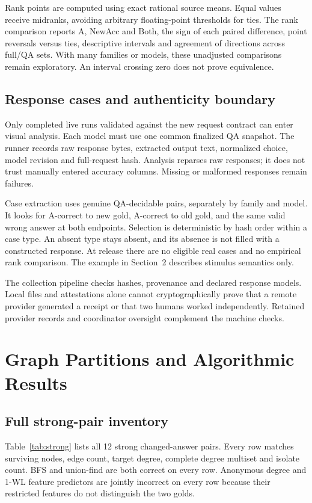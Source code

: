 \documentclass[10pt,twocolumn,letterpaper]{article}
\begin{document}
Rank points are computed using exact rational source means. Equal
values receive midranks, avoiding arbitrary floating-point thresholds
for ties. The rank comparison reports A, NewAcc and Both, the sign
of each paired difference, point reversals versus ties, descriptive
intervals and agreement of directions across full/QA sets. With many
families or models, these unadjusted comparisons remain exploratory.
An interval crossing zero does not prove equivalence.

\subsection{Response cases and authenticity boundary}
Only completed live runs validated against the new request contract
can enter visual analysis. Each model must use one common finalized
QA snapshot. The runner records raw response bytes, extracted output
text, normalized choice, model revision and full-request hash. Analysis
reparses raw responses; it does not trust manually entered accuracy
columns. Missing or malformed responses remain failures.

Case extraction uses genuine QA-decidable pairs, separately by family
and model. It looks for A-correct to new gold, A-correct to old gold,
and the same valid wrong answer at both endpoints. Selection is
deterministic by hash order within a case type. An absent type stays
absent, and its absence is not filled with a constructed response.
At release there are no eligible real cases and no empirical rank
comparison. The example in Section~2 describes stimulus semantics only.

The collection pipeline checks hashes, provenance and declared
response models. Local files and attestations alone cannot
cryptographically prove that a remote provider generated a receipt
or that two humans worked independently. Retained provider records
and coordinator oversight complement the machine checks.

\section{Graph Partitions and Algorithmic Results}
\subsection{Full strong-pair inventory}
Table~\ref{tab:strong} lists all 12 strong changed-answer pairs.
Every row matches surviving nodes, edge count, target degree,
complete degree multiset and isolate count. BFS and union-find are
both correct on every row. Anonymous degree and 1-WL feature
predictors are jointly incorrect on every row because their restricted
features do not distinguish the two golds.
\end{document}
